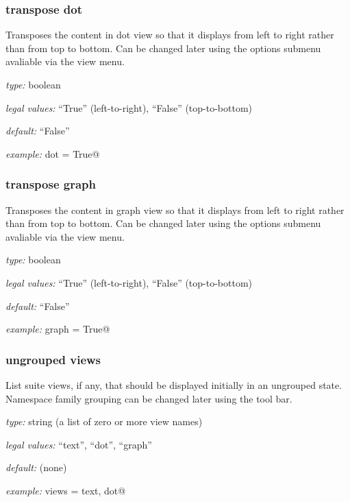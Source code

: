 \subsubsection{transpose dot}

Transposes the content in dot view so that it displays from left to right rather
than from top to bottom. Can be changed later using the options submenu
avaliable via the view menu.

\begin{myitemize}
    \item {\em type:} boolean
    \item {\em legal values:} ``True'' (left-to-right), ``False'' (top-to-bottom)
    \item {\em default:} ``False''
    \item {\em example:} \lstinline@transpose dot = True@
\end{myitemize}


\subsubsection{transpose graph}

Transposes the content in graph view so that it displays from left to right
rather than from top to bottom. Can be changed later using the options submenu
avaliable via the view menu.

\begin{myitemize}
    \item {\em type:} boolean
    \item {\em legal values:} ``True'' (left-to-right), ``False'' (top-to-bottom)
    \item {\em default:} ``False''
    \item {\em example:} \lstinline@transpose graph = True@
\end{myitemize}


\subsubsection{ungrouped views}

List suite views, if any, that should be displayed initially in an
ungrouped state. Namespace family grouping can be changed later
using the tool bar.

\begin{myitemize}
\item {\em type:} string (a list of zero or more view names)
\item {\em legal values:} ``text'', ``dot'',  ``graph''
\item {\em default:} (none)
\item {\em example:} \lstinline@ungrouped views = text, dot@
\end{myitemize}


